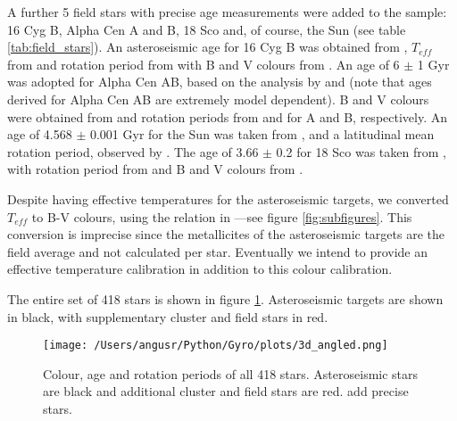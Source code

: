 \documentclass[10pt,preprint]{aastex}
\begin{document}
A further 5 field stars with precise age measurements were added to the sample: 16 Cyg B, Alpha Cen A and B, 18 Sco and, of course, the Sun (see table \ref{tab:field_stars}).
An asteroseismic age for 16 Cyg B was obtained from \citet{Metcalfe2012}, $T_{eff}$ from \citet{Ramirez2009} and rotation period from \citet{Henry2000} with B and V colours from \citet{Moffett1979}.
An age of 6 $\pm$ 1 Gyr was adopted for Alpha Cen AB, based on the analysis by \citet{Bazot2012} and \citet{Yildiz2007} (note that ages derived for Alpha Cen AB are extremely model dependent).
B and V colours were obtained from \citet{Mermilliod1986} and rotation periods from \citet{Hallam1991} and \citet{Dumusque2012} for A and B, respectively.
An age of 4.568 $\pm$ 0.001 Gyr for the Sun was taken from \citet{Bouvier2010}, and a latitudinal mean rotation period, observed by \citet{Donahue1996}.
The age of 3.66 $\pm$ 0.2 for 18 Sco was taken from \citet{Li2012}, with rotation period from \citet{Petit2008} and B and V colours from \citet{Mermilliod1986}.

Despite having effective temperatures for the asteroseismic targets, we converted $T_{eff}$ to B-V colours, using the relation in \citet{Sekiguchi2000}---see figure \ref{fig:subfigures}.
This conversion is imprecise since the metallicites of the asteroseismic targets are the field average and not calculated per star.
Eventually we intend to provide an effective temperature calibration in addition to this colour calibration.

The entire set of 418 stars is shown in figure \ref{fig:3d}. Asteroseismic targets are shown in black, with supplementary cluster and field stars in red.

\begin{figure}[ht]
\begin{center}
\texttt{[image: /Users/angusr/Python/Gyro/plots/3d\_angled.png]}
\caption{Colour, age and rotation periods of all 418 stars. Asteroseismic stars are black and additional cluster and field stars are red. {\color{red}add precise stars.}}
\label{fig:3d}
\end{center}
\end{figure}
\end{document}
